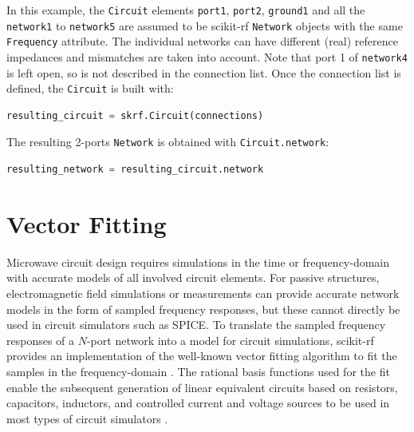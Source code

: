 \documentclass[10pt, letterpaper]{scrartcl}
\newcommand{\skrf}{{s}cikit-rf\xspace}
\begin{document}
In this example, the \texttt{Circuit} elements \texttt{port1}, \texttt{port2}, \texttt{ground1} and all the \texttt{network1} to \texttt{network5} are assumed to be \skrf{} \texttt{Network} objects with the same \texttt{Frequency} attribute. The individual networks can have different (real) reference impedances and mismatches are taken into account. Note that port 1 of \texttt{network4} is left open, so is not described in the connection list. Once the connection list is defined, the \texttt{Circuit} is built with:

\begin{lstlisting}[language=Python]
resulting_circuit = skrf.Circuit(connections)
\end{lstlisting}

The resulting 2-ports \texttt{Network} is obtained with \texttt{Circuit.network}:
\begin{lstlisting}[language=Python]
resulting_network = resulting_circuit.network
\end{lstlisting}



\section{Vector Fitting}
Microwave circuit design requires simulations in the time or frequency-domain with accurate models of all involved circuit elements. For passive structures, electromagnetic field simulations or measurements can provide accurate network models in the form of sampled frequency responses, but these cannot directly be used in circuit simulators such as SPICE. To translate the sampled frequency responses of a $N$-port network into a model for circuit simulations, \skrf{} provides an implementation of the well-known vector fitting algorithm to fit the samples in the frequency-domain \cite{vectfit}. The rational basis functions used for the fit enable the subsequent generation of linear equivalent circuits based on resistors, capacitors, inductors, and controlled current and voltage sources to be used in most types of circuit simulators \cite{vectfit_spice}. 
\end{document}
